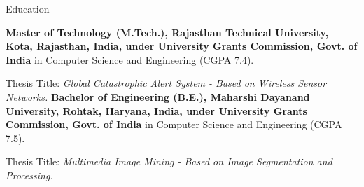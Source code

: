 \begin{rubric}{Education}

	\entry*[2009 -- 2011]%
		\textbf{Master of Technology (M.Tech.), Rajasthan Technical University, Kota, Rajasthan, India, under University Grants Commission, Govt. of India} in Computer Science and Engineering (CGPA 7.4).
		\par Thesis Title: \emph{Global Catastrophic Alert System - Based on Wireless Sensor Networks.}
	\entry*[2005 -- 2009]%
		\textbf{Bachelor of Engineering (B.E.), Maharshi Dayanand University, Rohtak, Haryana, India, under University Grants Commission, Govt. of India} in Computer Science and Engineering (CGPA 7.5).\par
		Thesis Title: \emph{Multimedia Image Mining - Based on Image Segmentation and Processing.}
	\end{rubric}